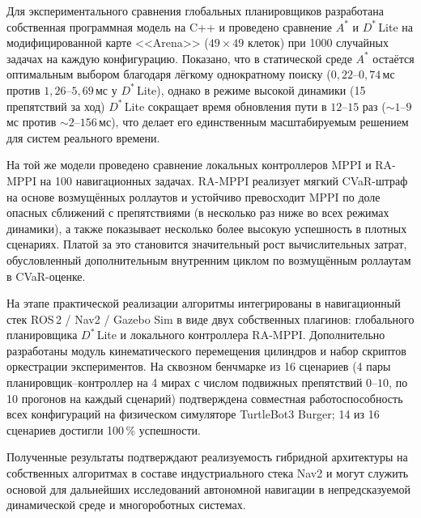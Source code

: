 \documentclass[a4paper,12pt]{extarticle}
\begin{document}
    Для экспериментального сравнения глобальных планировщиков разработана
    собственная программная модель на C++ и проведено сравнение $A^*$ и
    $D^*$\,Lite на модифицированной карте <<Arena>> ($49\times 49$ клеток) при 1000
    случайных задачах на каждую конфигурацию. Показано, что в статической
    среде $A^*$ остаётся оптимальным выбором благодаря лёгкому однократному
    поиску ($0{,}22$--$0{,}74$\,мс против $1{,}26$--$5{,}69$\,мс у $D^*$\,Lite),
    однако в режиме высокой динамики (15 препятствий за ход)
    $D^*$\,Lite сокращает время обновления пути в $12$--$15$ раз
    ($\sim 1$--$9$\,мс против $\sim 2$--$156$\,мс), что делает его единственным
    масштабируемым решением для систем реального времени.

    На той же модели проведено сравнение локальных контроллеров MPPI и RA-MPPI на 100 навигационных задачах. RA-MPPI реализует мягкий CVaR-штраф на основе возмущённых роллаутов и устойчиво превосходит MPPI по доле опасных сближений с препятствиями (в несколько раз ниже во всех режимах динамики), а также показывает несколько более высокую успешность в плотных сценариях. Платой за это становится значительный рост вычислительных затрат, обусловленный дополнительным внутренним циклом по возмущённым роллаутам в CVaR-оценке.

    На этапе практической реализации алгоритмы интегрированы в навигационный
    стек ROS\,2 / Nav2 / Gazebo Sim в виде двух собственных плагинов:
    глобального планировщика $D^*$\,Lite и локального контроллера RA-MPPI.
    Дополнительно разработаны модуль кинематического перемещения цилиндров
    и набор скриптов оркестрации экспериментов. На сквозном
    бенчмарке из 16 сценариев (4 пары планировщик--контроллер на 4 мирах
    с числом подвижных препятствий $0$--$10$, по 10 прогонов на каждый
    сценарий) подтверждена совместная работоспособность всех конфигураций
    на физическом симуляторе TurtleBot3 Burger; 14 из 16 сценариев
    достигли 100\,\% успешности.

    Полученные результаты подтверждают реализуемость гибридной архитектуры
    на собственных алгоритмах в составе индустриального стека Nav2 и могут
    служить основой для дальнейших исследований автономной навигации в
    непредсказуемой динамической среде и многороботных системах.

    \newpage

    \printbibliography[heading=bibintoc]
\end{document}
